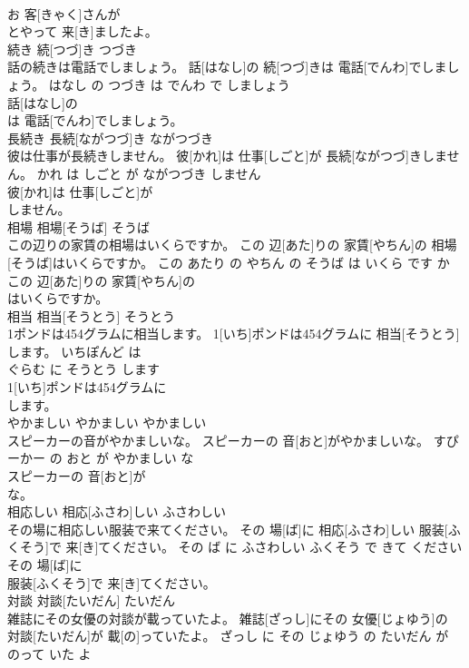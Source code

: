 \documentclass[8pt]{extreport}
\begin{document}
\begin{CJK}{UTF8}{min}
\\	お 客[きゃく]さんが
\\	とやって 来[き]ましたよ。			
\\	続き	続[つづ]き	つづき	
\\	話の続きは電話でしましょう。	話[はなし]の 続[つづ]きは 電話[でんわ]でしましょう。	はなし の つづき は でんわ で しましょう	
\\	話[はなし]の
\\	は 電話[でんわ]でしましょう。			
\\	長続き	長続[ながつづ]き	ながつづき	
\\	彼は仕事が長続きしません。	彼[かれ]は 仕事[しごと]が 長続[ながつづ]きしません。	かれ は しごと が ながつづき しません	
\\	彼[かれ]は 仕事[しごと]が
\\	しません。			
\\	相場	相場[そうば]	そうば	
\\	この辺りの家賃の相場はいくらですか。	この 辺[あた]りの 家賃[やちん]の 相場[そうば]はいくらですか。	この あたり の やちん の そうば は いくら です か	
\\	この 辺[あた]りの 家賃[やちん]の
\\	はいくらですか。			
\\	相当	相当[そうとう]	そうとう	
\\	1ポンドは454グラムに相当します。	1[いち]ポンドは454グラムに 相当[そうとう]します。	いちぽんど は 
\\	ぐらむ に そうとう します	
\\	1[いち]ポンドは454グラムに
\\	します。			
\\	やかましい	やかましい	やかましい	
\\	スピーカーの音がやかましいな。	スピーカーの 音[おと]がやかましいな。	すぴーかー の おと が やかましい な	
\\	スピーカーの 音[おと]が
\\	な。			
\\	相応しい	相応[ふさわ]しい	ふさわしい	
\\	その場に相応しい服装で来てください。	その 場[ば]に 相応[ふさわ]しい 服装[ふくそう]で 来[き]てください。	その ば に ふさわしい ふくそう で きて ください	
\\	その 場[ば]に
\\	服装[ふくそう]で 来[き]てください。			
\\	対談	対談[たいだん]	たいだん	
\\	雑誌にその女優の対談が載っていたよ。	雑誌[ざっし]にその 女優[じょゆう]の 対談[たいだん]が 載[の]っていたよ。	ざっし に その じょゆう の たいだん が のって いた よ	

\end{CJK}
\end{document}
